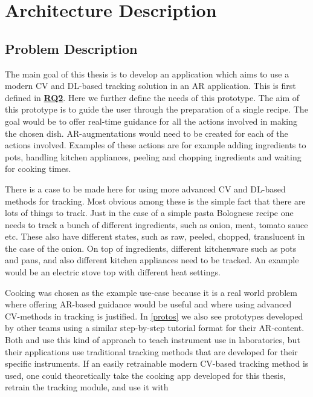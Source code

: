 \chapter{Architecture Description} \label{Arch description}

\section{Problem Description} \label{probDesc}

The main goal of this thesis is to develop an application which aims to use a 
modern CV and DL-based tracking solution in an AR application. This is first 
defined in \hyperref[rq2]{\textbf{RQ2}}. Here we further define the needs of 
this prototype. The aim of this prototype is to guide the user through the 
preparation of a single recipe. The goal would be to offer real-time guidance 
for all the actions involved in making the chosen dish. AR-augmentations 
would need to be created for each of the actions involved. Examples of these 
actions are for example adding ingredients to pots, handling kitchen 
appliances, peeling and chopping ingredients and waiting for cooking times. \par
	There is a case to be made here for using more advanced CV and 
DL-based methods for tracking. Most obvious among these is the simple fact 
that there are lots of things to track. Just in the case of a simple pasta 
Bolognese recipe one needs to track a bunch of different ingredients, such as 
onion, meat, tomato sauce etc. These also have different states, such as raw, 
peeled, chopped, translucent in the case of the onion. On top of ingredients, 
different kitchenware such as pots and pans, and also different kitchen 
appliances need to be tracked. An example would be an electric stove top with 
different heat settings. \par
	Cooking was chosen as the example use-case because it is a real world 
problem where offering AR-based guidance would be useful and where using 
advanced CV-methods in tracking is justified. In \ref{protos} we also see 
prototypes developed by other teams using a similar step-by-step tutorial 
format for their AR-content. Both \textcite{pylvanainen} and 
\textcite{reyesEtAl2016} use this kind of approach to teach instrument use in 
laboratories, but their applications use traditional tracking methods that 
are developed for their specific instruments. If an easily retrainable modern 
CV-based tracking method is used, one could theoretically take the cooking 
app developed for this thesis, retrain the tracking module, and use it with 
